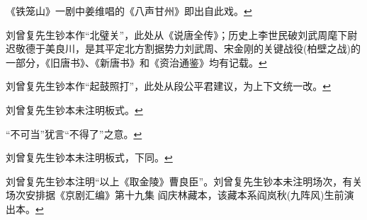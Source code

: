   《铁笼山》一剧中姜维唱的《八声甘州》即出自此戏。\protect\hyperlink{fnref671}{↩}
\item
  \leavevmode\hypertarget{fn672}{}%
  刘曾复先生钞本作``北璧关''，此处从《说唐全传》；历史上李世民破刘武周麾下尉迟敬德于美良川，是其平定北方割据势力刘武周、宋金刚的关键战役(柏壁之战)的一部分，《旧唐书》、《新唐书》和《资治通鉴》均有记载。\protect\hyperlink{fnref672}{↩}
\item
  \leavevmode\hypertarget{fn673}{}%
  刘曾复先生钞本作``起鼓照打''，此处从段公平君建议，为上下文统一改。\protect\hyperlink{fnref673}{↩}
\item
  \leavevmode\hypertarget{fn674}{}%
  刘曾复先生钞本未注明板式。\protect\hyperlink{fnref674}{↩}
\item
  \leavevmode\hypertarget{fn675}{}%
  ``不可当''犹言``不得了''之意。\protect\hyperlink{fnref675}{↩}
\item
  \leavevmode\hypertarget{fn676}{}%
  刘曾复先生钞本未注明板式，下同。\protect\hyperlink{fnref676}{↩}
\item
  \leavevmode\hypertarget{fn677}{}%
  刘曾复先生钞本注明``以上《取金陵》曹良臣''。刘曾复先生钞本未注明场次，有关场次安排据《京剧汇编》第十九集
  阎庆林藏本，该藏本系阎岚秋(九阵风)生前演出本。\protect\hyperlink{fnref677}{↩}
